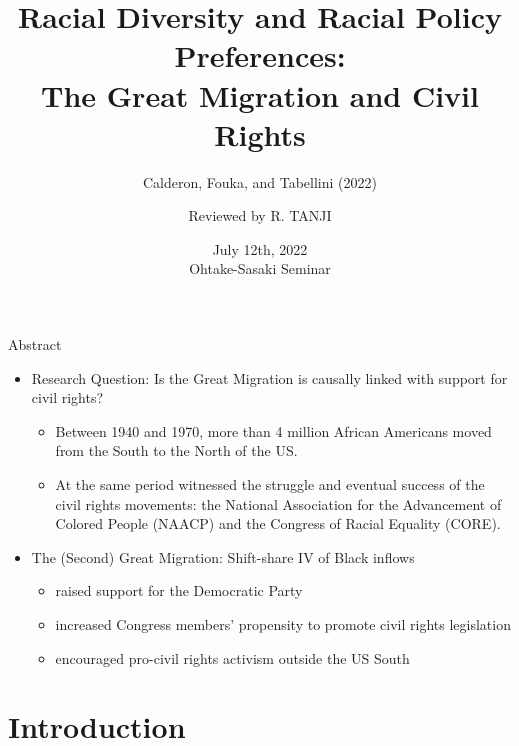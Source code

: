 \documentclass[dvipdfmx,11pt]{beamer}
\title[Calderon, Fouka, and Tabellini, 2022]{Racial Diversity and Racial Policy Preferences: \\
The Great Migration and Civil Rights}
\subtitle{Calderon, Fouka, and Tabellini (2022)}
\author{Reviewed by R. TANJI}
\date[6/12/2022 OS Semi.]{July 12th, 2022 \\ Ohtake-Sasaki Seminar}
\institute[]{Osaka University, Graduate School of Economics}
\begin{document}
\begin{frame}\frametitle{}
\titlepage
\end{frame}

\begin{frame}{Abstract}
  \begin{itemize}
    \item Research Question: Is the Great Migration is causally linked with support for civil rights?
    \begin{itemize}
      \item Between 1940 and 1970, more than 4 million African Americans moved from the South to the North of the US.
      \item At the same period witnessed the struggle and eventual success of the civil rights movements: the
      National Association for the Advancement of Colored People (NAACP) and the Congress of
      Racial Equality (CORE).
    \end{itemize}
    \item The (Second) Great Migration: Shift-share IV of Black inflows
    \begin{itemize}
      \item raised support for the Democratic Party
      \item increased Congress members' propensity to promote civil rights legislation
      \item encouraged pro-civil rights activism outside the US South
    \end{itemize} 
  \end{itemize}
\end{frame}

\frame{\tableofcontents}

\section{Introduction}
\frame{\sectionpage}
\end{document}
